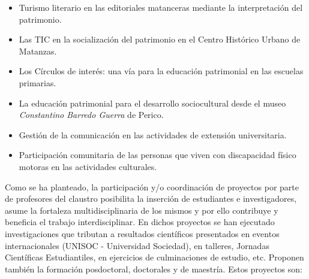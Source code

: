 \begin{itemize}
	\setlength\itemsep{-0.5em}
	\item Turismo literario en las editoriales matanceras mediante la interpretación del patrimonio.
	\item Las TIC en la socialización del patrimonio en el Centro Histórico Urbano de Matanzas.
	\item Los Círculos de interés: una vía para la educación patrimonial en las escuelas primarias.
	\item La educación patrimonial para el desarrollo sociocultural desde el museo \emph{Constantino Barredo Guerra} de Perico.
	\item Gestión de la comunicación en las actividades de extensión universitaria.
	\item Participación comunitaria de las personas que viven con discapacidad físico motoras en las actividades culturales.
\end{itemize}

Como se ha planteado, la participación y/o coordinación de proyectos por parte de profesores del claustro posibilita la inserción de estudiantes e investigadores, asume la fortaleza multidisciplinaria de los mismos y por ello contribuye y beneficia el trabajo interdisciplinar. En dichos proyectos se han ejecutado investigaciones que tributan a resultados científicos presentados en eventos internacionales (UNISOC - Universidad Sociedad), en talleres, Jornadas Científicas Estudiantiles, en ejercicios de culminaciones de estudio, etc. Proponen también la formación posdoctoral, doctorales y de maestría. Estos proyectos son:  

